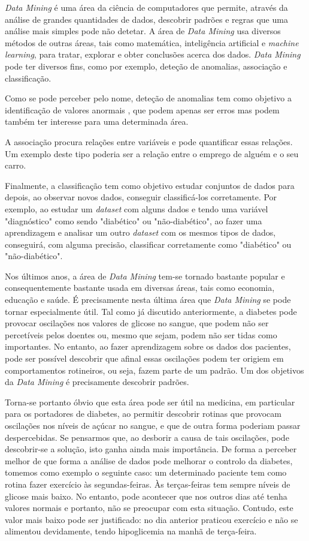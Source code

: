 \textit{Data Mining} é uma área da ciência de computadores que permite, através da análise de grandes quantidades de dados, descobrir padrões e regras que uma análise mais simples pode não detetar. A área de \textit{Data Mining} usa diversos métodos de outras áreas, tais como matemática, inteligência artificial e \textit{machine learning}, para tratar, explorar e obter conclusões acerca dos dados. \textit{Data Mining} pode ter diversos fins, como por exemplo,  deteção de anomalias, associação e classificação.

Como se pode perceber pelo nome, deteção de anomalias tem como objetivo a identificação de valores anormais , que podem apenas ser erros mas podem também ter interesse para uma determinada área.

A associação procura relações entre variáveis e pode quantificar essas relações. Um exemplo deste tipo poderia ser a relação entre o emprego de alguém e o seu carro.

Finalmente, a classificação tem como objetivo estudar conjuntos de dados para depois, ao observar novos dados, conseguir classificá-los corretamente. Por exemplo, ao estudar um \textit{dataset} com alguns dados e tendo uma variável "diagnóstico" como sendo "diabético" ou "não-diabético", ao fazer uma aprendizagem e analisar um outro \textit{dataset} com os mesmos tipos de dados, conseguirá, com alguma precisão, classificar corretamente como "diabético" ou "não-diabético".

Nos últimos anos, a área de \textit{Data Mining} tem-se tornado bastante popular e consequentemente bastante usada em diversas áreas, tais como economia, educação e saúde. É precisamente nesta última área que \textit{Data Mining} se pode tornar especialmente útil. Tal como já discutido anteriormente, a diabetes pode provocar oscilações nos valores de glicose no sangue, que podem não ser percetíveis pelos doentes ou, mesmo que sejam, podem não ser tidas como importantes. No entanto, ao fazer aprendizagem sobre os dados dos pacientes, pode ser possível descobrir que afinal essas oscilações podem ter origiem em comportamentos rotineiros, ou seja, fazem parte de um padrão. Um dos objetivos da \textit{Data Mining} é precisamente descobrir padrões. 

Torna-se portanto óbvio que esta área pode ser útil na medicina, em particular para os portadores de diabetes, ao permitir descobrir rotinas que provocam oscilações nos níveis de açúcar no sangue, e que de outra forma poderiam passar despercebidas. Se pensarmos que, ao desborir a causa de tais oscilações, pode descobrir-se a solução, isto ganha ainda mais importância. De forma a perceber melhor de que forma a análise de dados pode melhorar o controlo da diabetes, tomemos como exemplo o seguinte caso: um determinado paciente tem como rotina fazer exercício às segundas-feiras. Às terças-feiras tem sempre níveis de glicose mais baixo. No entanto, pode acontecer que nos outros dias até tenha valores normais e portanto, não se preocupar com esta situação. Contudo, este valor mais baixo pode ser justificado: no dia anterior praticou exercício e não se alimentou devidamente, tendo hipoglicemia na manhã de terça-feira.

